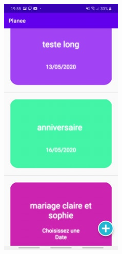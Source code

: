 \documentclass[12pt,a4paper]{report}
\begin{document}
\begin{flushleft}
\begin{figure}[!h]
\begin{subfigure}[b]{0.3\textwidth}
        \includegraphics[width=\textwidth]{HomeWEvents1}
    \end{subfigure}

\end{figure}
\end{flushleft}
\end{document}
